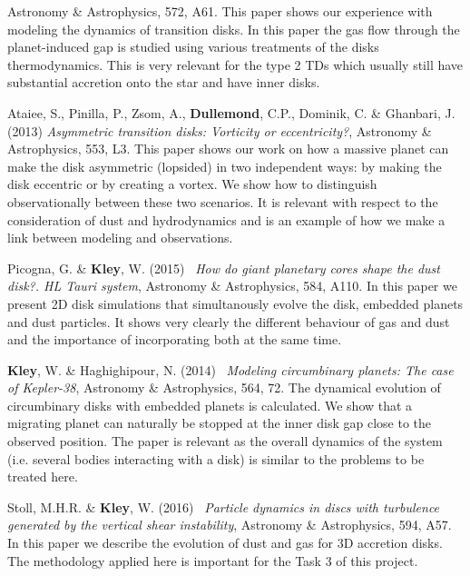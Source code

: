 \documentclass[10pt,fleqn,twoside]{article}
\begin{document}
\begin{literature}
   Astronomy \& Astrophysics, 572, A61.
  This paper shows our experience with modeling the dynamics of transition disks. In this paper
  the gas flow through the planet-induced gap is studied using various treatments of the disks thermodynamics.
  This is very relevant for the type 2 TDs which usually still have substantial accretion
  onto the star and have inner disks.
\item
 {Ataiee}, S., {Pinilla}, P., {Zsom}, A., {\bf Dullemond}, C.P., {Dominik}, C. \& {Ghanbari}, J. (2013)
   {\it Asymmetric transition disks: Vorticity or eccentricity?},
   Astronomy \& Astrophysics, 553, L3.
   This paper shows our work on how a
  massive planet can make the disk asymmetric (lopsided) in two independent
  ways: by making the disk eccentric or by creating a vortex. We show how to
  distinguish observationally between these two scenarios. It is 
  relevant with respect to the consideration of dust and hydrodynamics and is an example
  of how we make a link between modeling and observations.
\item
  {Picogna}, G. \& {\bf Kley}, W. (2015) \,
  {\it How do giant planetary cores shape the dust disk?. HL Tauri system},
  Astronomy \& Astrophysics, 584, A110. In this paper we present 2D disk simulations that simultanously
  evolve the disk, embedded planets and dust particles. It shows very clearly the different behaviour of gas
  and dust and the importance of incorporating both at the same time.
\item
  {\bf Kley}, W. \& {Haghighipour}, N. (2014) \,
  {\it Modeling circumbinary planets: The case of Kepler-38},
  Astronomy \& Astrophysics, 564, 72. The dynamical evolution of circumbinary disks with embedded planets 
  is calculated. We show that a migrating planet can naturally be stopped at the inner disk gap 
  close to the observed position. The paper is relevant as the overall dynamics of the system 
  (i.e. several bodies interacting with a disk) is similar to the problems to be treated here.
\item
  {Stoll}, M.H.R. \& {\bf Kley}, W. (2016) \,
  {\it Particle dynamics in discs with turbulence generated by the vertical shear instability},
  Astronomy \& Astrophysics, 594, A57. In this paper we describe the evolution of dust and gas for 3D
  accretion disks. The methodology applied here is important for the Task 3 of this project.
\end{literature}

\end{document}
